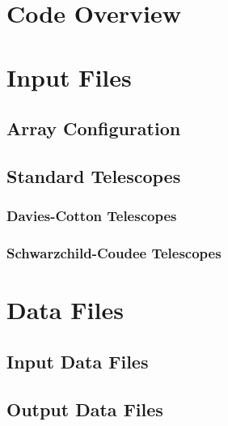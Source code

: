\documentclass{article}
\begin{document}
\section{Code Overview}\label{S:OVERV}

\section{Input Files}\label{S:INPUT}

\subsection{Array Configuration}\label{SS:ARRAY}

\subsection{Standard Telescopes}\label{SSS:}


\subsubsection{Davies-Cotton Telescopes}\label{SSS:}


\subsubsection{Schwarzchild-Coudee Telescopes}\label{SSS:}

\section{Data Files}\label{S:DATAF}
\subsection{Input Data Files}\label{SS:INDATA}


\subsection {Output Data Files}\label{SS:ODATA}
\end{document}
